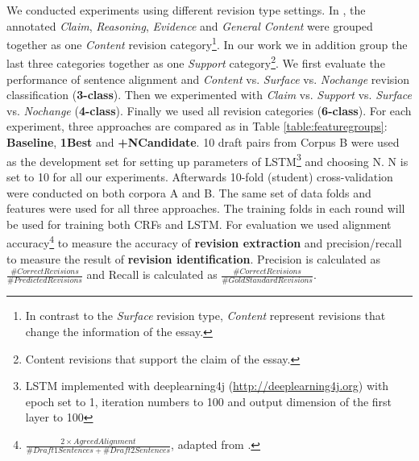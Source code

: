 \documentclass[11pt]{article}
\begin{document}
We conducted experiments using different revision type settings. In \cite{zhang-litman:2015:bea}, the annotated \textit{Claim}, \textit{Reasoning}, \textit{Evidence} and \textit{General Content} were grouped together as one \textit{Content} revision category\footnote{In contrast to the \textit{Surface} revision type, \textit{Content} represent revisions that change the information of the essay.}. In our work we in addition group the last three categories together as one \textit{Support} category\footnote{Content revisions that support the claim of the essay.}. We first evaluate the performance of sentence alignment and \textit{Content} vs. \textit{Surface} vs. \textit{Nochange} revision classification (\textbf{3-class}). Then we experimented with \textit{Claim} vs. \textit{Support} vs. \textit{Surface} vs. \textit{Nochange} (\textbf{4-class}). Finally we used all revision categories (\textbf{6-class}). For each experiment, three approaches are compared as in Table \ref{table:featuregroups}: \textbf{Baseline}, \textbf{1Best} and \textbf{+NCandidate}. 10 draft pairs from Corpus B were used as the development set for setting up parameters of LSTM\footnote{LSTM implemented with deeplearning4j (\url{http://deeplearning4j.org}) with epoch set to 1, iteration numbers to 100 and output dimension of the first layer to 100} and choosing N. N is set to 10 for all our experiments. Afterwards 10-fold (student) cross-validation were conducted on both corpora A and B. The same set of data folds and features were used for all three approaches. The training folds in each round will be used for training both CRFs and LSTM. For evaluation we used alignment accuracy\footnote{$\frac{2 \times AgreedAlignment}{\#Draft1Sentences + \#Draft2Sentences} $, adapted from \cite{zhang-litman:2014:W14-18}.} to measure the accuracy of \textbf{revision extraction} and precision/recall to measure the result of \textbf{revision identification}. Precision is calculated as $\frac{\#Correct Revisions}{\#Predicted Revisions}$ and Recall is calculated as $\frac{\#Correct Revisions}{\#GoldStandardRevisions}$.
\end{document}
